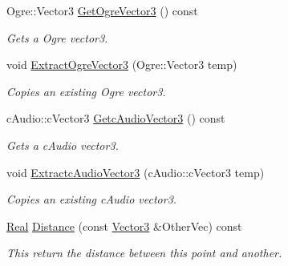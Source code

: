 \begin{DoxyCompactItemize}
Ogre::Vector3 \hyperlink{classphys_1_1Vector3_a17265d86a74139398d310b56ba7e89b8}{GetOgreVector3} () const 
\begin{DoxyCompactList}\small\item\em Gets a Ogre vector3. \item\end{DoxyCompactList}\item 
void \hyperlink{classphys_1_1Vector3_a09a31cb8fe491f61e0cc10d21705a0df}{ExtractOgreVector3} (Ogre::Vector3 temp)
\begin{DoxyCompactList}\small\item\em Copies an existing Ogre vector3. \item\end{DoxyCompactList}\item 
cAudio::cVector3 \hyperlink{classphys_1_1Vector3_a58b1ac39dfee4c360c16944a7e7f657d}{GetcAudioVector3} () const 
\begin{DoxyCompactList}\small\item\em Gets a cAudio vector3. \item\end{DoxyCompactList}\item 
void \hyperlink{classphys_1_1Vector3_aa12021e9cdc092c8628ced1c5910c04c}{ExtractcAudioVector3} (cAudio::cVector3 temp)
\begin{DoxyCompactList}\small\item\em Copies an existing cAudio vector3. \item\end{DoxyCompactList}\item 
\hyperlink{namespacephys_af7eb897198d265b8e868f45240230d5f}{Real} \hyperlink{classphys_1_1Vector3_af59a586331fe9497056b7e0f207658a3}{Distance} (const \hyperlink{classphys_1_1Vector3}{Vector3} \&OtherVec) const 
\begin{DoxyCompactList}\small\item\em This return the distance between this point and another. \item\end{DoxyCompactList}\end{DoxyCompactItemize}
